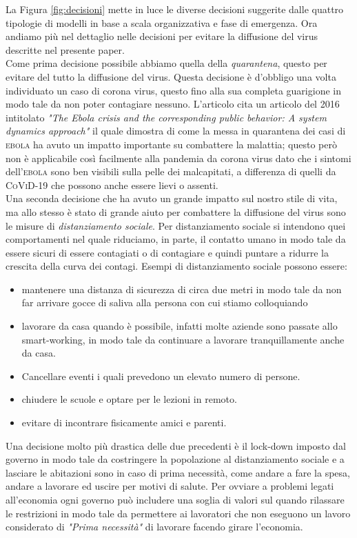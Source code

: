 \documentclass[12pt, openany]{book}
\begin{document}
 	La Figura \ref{fig:decisioni} mette in luce le diverse decisioni suggerite dalle quattro tipologie di modelli in base a scala organizzativa e fase di emergenza.
	Ora andiamo più nel dettaglio nelle decisioni per evitare la diffusione del virus descritte nel presente paper.\\
	Come prima decisione possibile abbiamo quella della \emph{quarantena}, questo per evitare del tutto la diffusione del virus. Questa decisione è d'obbligo una volta individuato un caso di corona virus, questo fino alla sua completa guarigione in modo tale da non poter contagiare nessuno. L'articolo cita un articolo del 2016 intitolato \emph{"The Ebola crisis and the corresponding public behavior: A system dynamics approach"} il quale dimostra di come la messa in quarantena dei casi di \textsc{ebola} ha avuto un impatto importante su combattere la malattia; questo però non è applicabile così facilmente alla pandemia da corona virus dato che i sintomi dell'\textsc{ebola} sono ben visibili sulla pelle dei malcapitati, a differenza di quelli da \textsc{CoViD-19} che possono anche essere lievi o assenti.\\
	Una seconda decisione che ha avuto un grande impatto sul nostro stile di vita, ma allo stesso è stato di grande aiuto per combattere la diffusione del virus sono le misure di \emph{distanziamento sociale}. Per distanziamento sociale si intendono quei comportamenti nel quale riduciamo, in parte, il contatto umano in modo tale da essere sicuri di essere contagiati o di contagiare e quindi puntare a ridurre la crescita della curva dei contagi. Esempi di distanziamento sociale possono essere: \begin{itemize}
		\item mantenere una distanza di sicurezza di circa due metri in modo tale da non far arrivare gocce di saliva alla persona con cui stiamo colloquiando
		\item lavorare da casa quando è possibile, infatti molte aziende sono passate allo smart-working, in modo tale da continuare a lavorare tranquillamente anche da casa.
		\item Cancellare eventi i quali prevedono un elevato numero di persone.
		\item chiudere le scuole e optare per le lezioni in remoto.
		\item evitare di incontrare fisicamente amici e parenti.
	\end{itemize}
	Una decisione molto più drastica delle due precedenti è il lock-down imposto dal governo in modo tale da costringere la popolazione al distanziamento sociale e a lasciare le abitazioni sono in caso di prima necessità, come andare a fare la spesa, andare a lavorare ed uscire per motivi di salute. Per ovviare a problemi legati all'economia ogni governo può includere una soglia di valori sul quando rilassare le restrizioni in modo tale da permettere ai lavoratori che non eseguono un lavoro considerato di \emph{"Prima necessità"} di lavorare facendo girare l'economia.\\
\end{document}
